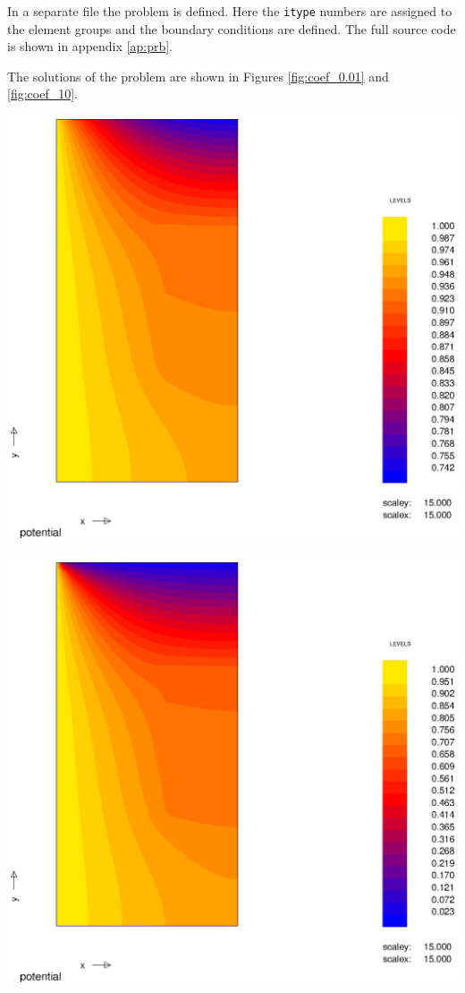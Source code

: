 In a separate file the problem is defined. Here the \texttt{itype} numbers are assigned to the element groups and the boundary conditions are defined. The full source code is shown in appendix \ref{ap:prb}.

The solutions of the problem are shown in Figures \ref{fig:coef_0.01} and \ref{fig:coef_10}. 

\begin{Figure}
 \centerfloat
 \includegraphics[width=0.8\linewidth]{coef_001.eps}
 \label{fig:coef_0.01}
\end{Figure}

\begin{Figure}
 \centerfloat
 \includegraphics[width=0.8\linewidth]{coef_10.eps}
 \label{fig:coef_10}
\end{Figure}